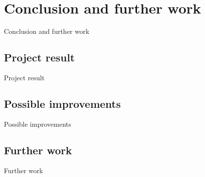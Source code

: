 \part{Conclusion and further work}
Conclusion and further work

\chapter{Project result}
Project result

\chapter{Possible improvements}
Possible improvements

\chapter{Further work}
Further work
